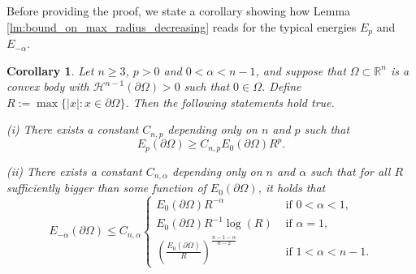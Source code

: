 \documentclass[10pt,leqno]{amsart}
\newcommand{\R}[0]{\mathbb{R}}
\newcommand{\p}{\partial}
\newcommand{\delomega}{\partial\Omega}
\numberwithin{Theorem}{section}
\newtheorem{Corollary}[Theorem]{Corollary}
\theoremstyle{definition}
\theoremstyle{remark}
\numberwithin{equation}{section}
\numberwithin{equation}{section}
\begin{document}
Before providing the proof, we state a corollary showing how Lemma \ref{lm:bound_on_max_radius_decreasing} reads for the typical energies $E_p$ and $E_{-\alpha}$.


\begin{Corollary}\label{corollary:estimates Ep Ealpha and R}
Let $n\geq 3$, $p>0$ and $0<\alpha<n-1$, and suppose that $\Omega\subset\R^n$ is a convex body with $\mathcal{H}^{n-1}(\p\Omega)>0$ such that $0\in\Omega$. Define $R:=\max \{ |x| : x \in \p \Omega\}$. Then the following statements hold true.

\smallskip
(i) There exists a constant $C_{n,p}$ depending only on $n$ and $p$ such that
$$
E_p(\delomega)\geq C_{n,p} E_0(\delomega)R^p.
$$

(ii) There exists a constant $C_{n,\alpha}$ depending only on $n$ and $\alpha$ such that for all $R$ sufficiently bigger than some function of $E_0(\delomega)$, it holds that
$$
E_{-\alpha}(\delomega)\leq C_{n,\alpha}    \begin{cases}    E_0(\delomega) R^{-\alpha} & \text{ if } 0<\alpha<1, \\    E_0(\delomega) R^{-1}\log(R) & \text{ if } \alpha=1, \\ \displaystyle    \left( \frac{E_0(\delomega)}{R} \right)^{\frac{n-1-\alpha}{n-2}} & \text{ if } 1<\alpha<n-1.    \end{cases}
$$
\end{Corollary}
\end{document}
